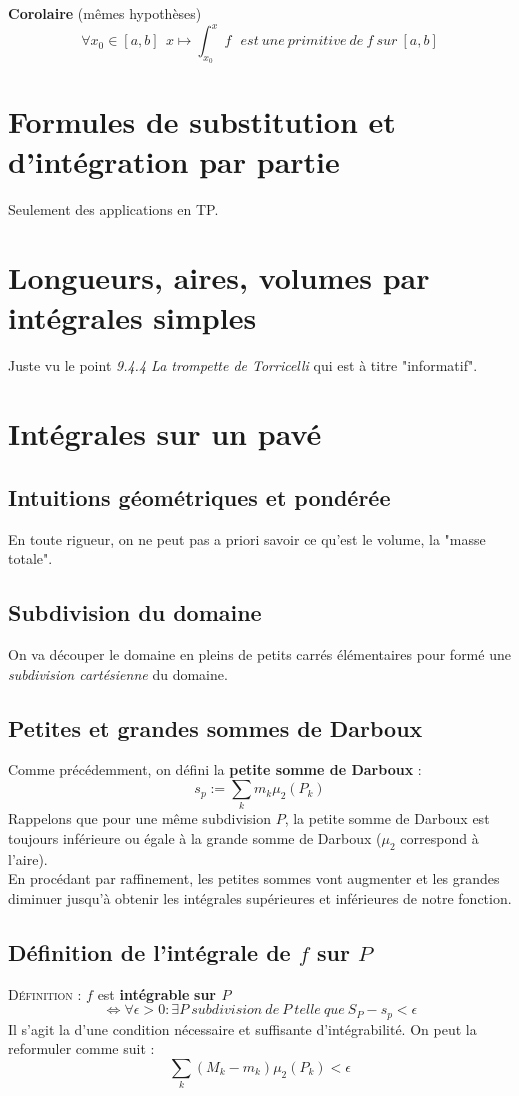 \documentclass[11pt, a4paper, openany]{book}
\begin{document}
\textbf{Corolaire} (mêmes hypothèses)
$$\forall x_0 \in [a,b]\ \ x \mapsto \int^x_{x_0} f\ \ \ est\ une\ primitive\ de\ f\ sur\ [a,b]$$

\section{Formules de substitution et d'intégration par partie}
Seulement des applications en TP.

\section{Longueurs, aires, volumes par intégrales simples}
Juste vu le point \textit{9.4.4 La trompette de Torricelli} qui est à titre "informatif".

\section{Intégrales sur un pavé}
\subsection{Intuitions géométriques et pondérée}
En toute rigueur, on ne peut pas a priori savoir ce qu'est le volume, la "masse totale".

\subsection{Subdivision du domaine}
On va découper le domaine en pleins de petits carrés élémentaires pour formé une \textit{subdivision cartésienne} du domaine.

\subsection{Petites et grandes sommes de Darboux}
Comme précédemment, on défini la \textbf{petite somme de Darboux} :
$$s_p := \sum_k m_k\mu_2(P_k)$$
Rappelons que pour une même subdivision $P$, la petite somme de Darboux est toujours inférieure ou égale à la grande somme de Darboux ($\mu_2$ correspond à l'aire). \\

En procédant par raffinement, les petites sommes vont augmenter et les grandes diminuer jusqu'à obtenir les intégrales supérieures et inférieures de notre fonction.

\subsection{Définition de l'intégrale de $f$ sur $P$}
\textsc{Définition :} $f$ est \textbf{intégrable} \textbf{sur $P$} 
$$\Leftrightarrow \forall \epsilon > 0: \exists P\ subdivision\ de\ P\ telle\ que\ S_P - s_p < \epsilon$$
Il s'agit la d'une condition nécessaire et suffisante d'intégrabilité. On peut la reformuler comme suit : 
$$\sum_k(M_k - m_k)\mu_2(P_k) < \epsilon$$
\end{document}
